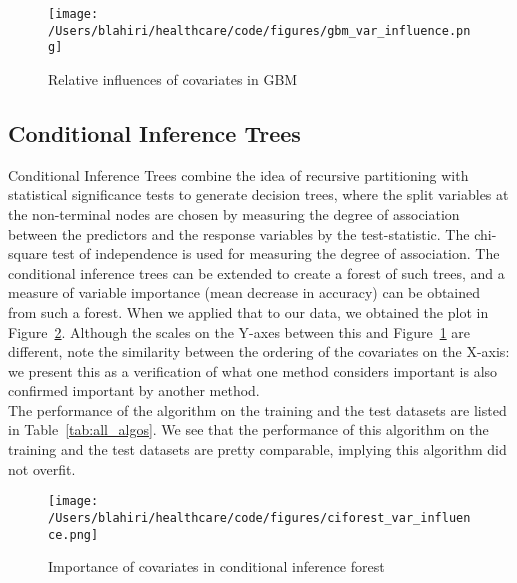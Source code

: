 \begin{figure}[!h]
    \centering
    \texttt{[image: /Users/blahiri/healthcare/code/figures/gbm\_var\_influence.png]}
    \caption{\small Relative influences of covariates in GBM}
    \label{fig:gbm_var_influence}
\end{figure}

\subsection{Conditional Inference Trees}
Conditional Inference Trees \cite{HHZ06} combine the idea of recursive partitioning with statistical significance tests to generate decision trees, where the split variables at the non-terminal nodes are chosen by measuring the degree of association between the predictors and the response variables by the test-statistic. The chi-square test of independence \cite{chi} is used for measuring the degree of association. The conditional inference trees can be extended to create a forest of such trees, and a measure of variable importance (mean decrease in accuracy) can be obtained from such a forest. When we applied that to our data, we obtained the plot in Figure~\ref{fig:ciforest_var_influence}. Although the scales on the Y-axes between this and Figure~\ref{fig:gbm_var_influence} are different,  note the similarity between the ordering of the covariates on the X-axis: we present this as a verification of what one method considers important is also confirmed important by another method.\\

The performance of the algorithm on the training and the test datasets are listed in Table~\ref{tab:all_algos}. We see that the performance of this algorithm on the training and the test datasets are pretty comparable, implying this algorithm did not overfit. 

\begin{figure}[!h]
    \centering
    \texttt{[image: /Users/blahiri/healthcare/code/figures/ciforest\_var\_influence.png]}
    \caption{\small Importance of covariates in conditional inference forest}
    \label{fig:ciforest_var_influence}
\end{figure}

